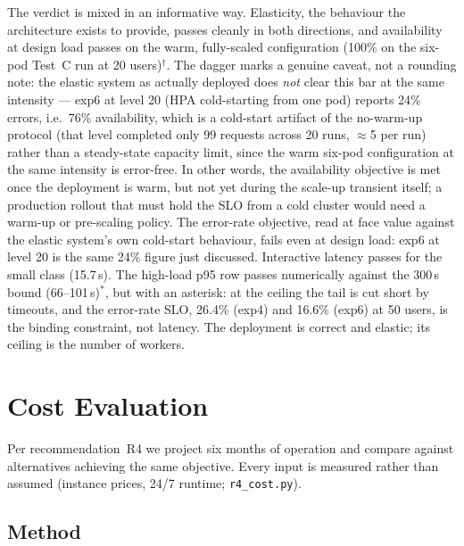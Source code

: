 \documentclass[conference]{IEEEtran}
\newcommand{\code}[1]{\texttt{#1}}
\begin{document}
The verdict is mixed in an informative way. Elasticity, the behaviour the
architecture exists to provide, passes cleanly in both directions, and
availability at design load passes on the warm, fully-scaled configuration
(100\% on the six-pod Test~C run at 20 users)$^{\dagger}$. The dagger marks
a genuine caveat, not a rounding note: the elastic system as actually
deployed does \emph{not} clear this bar at the same intensity --- exp6 at
level 20 (HPA cold-starting from one pod) reports 24\% errors, i.e.\ 76\%
availability, which is a cold-start artifact of the no-warm-up protocol
(that level completed only 99 requests across 20 runs, $\approx$5 per run)
rather than a steady-state capacity limit, since the warm six-pod
configuration at the same intensity is error-free. In other words, the
availability objective is met once the deployment is warm, but not yet
during the scale-up transient itself; a production rollout that must hold
the SLO from a cold cluster would need a warm-up or pre-scaling policy.
The error-rate objective, read at face value against the elastic system's
own cold-start behaviour, fails even at design load: exp6 at level 20 is the
same 24\% figure just discussed. Interactive latency passes for the small class (15.7\,s).
The high-load p95 row passes numerically against the 300\,s bound
(66--101\,s)$^{*}$, but with an asterisk: at the ceiling the tail is cut short
by timeouts, and the error-rate SLO, 26.4\% (exp4) and 16.6\% (exp6) at 50
users, is the binding constraint, not latency. The deployment is correct
and elastic; its ceiling is the number of workers.

\section{Cost Evaluation}
\label{sec:cost}

Per recommendation~R4 we project six months of operation and compare against
alternatives achieving the same objective. Every input is measured rather than
assumed (instance prices, 24/7 runtime; \code{r4\_cost.py}).

\subsection{Method}
\end{document}
